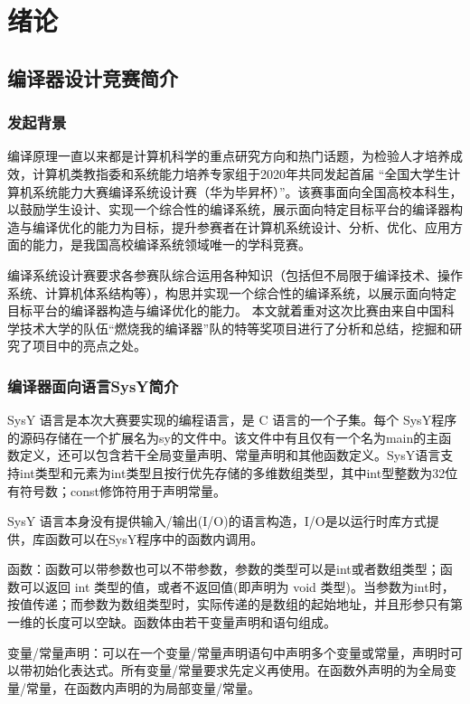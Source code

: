
\chapter{绪论}

\section{编译器设计竞赛简介}

\subsection{发起背景}

编译原理一直以来都是计算机科学的重点研究方向和热门话题，为检验人才培养成效，计算机类教指委和系统能力培养专家组于2020年共同发起首届 “全国大学生计算机系统能力大赛编译系统设计赛（华为毕昇杯）”。该赛事面向全国高校本科生，以鼓励学生设计、实现一个综合性的编译系统，展示面向特定目标平台的编译器构造与编译优化的能力为目标，提升参赛者在计算机系统设计、分析、优化、应用方面的能力，是我国高校编译系统领域唯一的学科竞赛。

编译系统设计赛要求各参赛队综合运用各种知识（包括但不局限于编译技术、操作系统、计算机体系结构等），构思并实现一个综合性的编译系统，以展示面向特定目标平台的编译器构造与编译优化的能力。
本文就着重对这次比赛由来自中国科学技术大学的队伍“燃烧我的编译器”队的特等奖项目进行了分析和总结，挖掘和研究了项目中的亮点之处。

\subsection{编译器面向语言SysY简介}

SysY 语言是本次大赛要实现的编程语言，是 C 语言的一个子集。每个 SysY程序的源码存储在一个扩展名为sy的文件中。该文件中有且仅有一个名为main的主函数定义，还可以包含若干全局变量声明、常量声明和其他函数定义。SysY语言支持int类型和元素为int类型且按行优先存储的多维数组类型，其中int型整数为32位有符号数；const修饰符用于声明常量。

SysY 语言本身没有提供输入/输出(I/O)的语言构造，I/O是以运行时库方式提供，库函数可以在SysY程序中的函数内调用。

函数：函数可以带参数也可以不带参数，参数的类型可以是int或者数组类型；函数可以返回 int 类型的值，或者不返回值(即声明为 void 类型)。当参数为int时，按值传递；而参数为数组类型时，实际传递的是数组的起始地址，并且形参只有第一维的长度可以空缺。函数体由若干变量声明和语句组成。

变量/常量声明：可以在一个变量/常量声明语句中声明多个变量或常量，声明时可以带初始化表达式。所有变量/常量要求先定义再使用。在函数外声明的为全局变量/常量，在函数内声明的为局部变量/常量。

